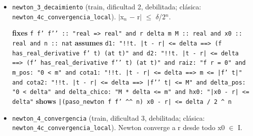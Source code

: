 \documentclass[11pt,a4paper]{article}
\begin{document}
\begin{itemize}
  \item \texttt{newton\_\allowbreak{}3\_\allowbreak{}decaimiento} (train, dificultad 2, debilitada; clásica: \texttt{newton\_\allowbreak{}4c\_\allowbreak{}convergencia\_\allowbreak{}local}). $|$x$_{n}$ $-$ r$|$ $\le $ $\delta $/2$^{n}$.\\
  {\footnotesize \textbf{fixes} \texttt{f f' f'{}' :\allowbreak{}:\allowbreak{} "real =\allowbreak{}> real" and r delta m M :\allowbreak{}:\allowbreak{} real and x0 :\allowbreak{}:\allowbreak{} real and n :\allowbreak{}:\allowbreak{} nat} \textbf{assumes} \texttt{d1:\allowbreak{} "!{}!t. |\allowbreak{}t -\allowbreak{} r|\allowbreak{} <=\allowbreak{} delta =\allowbreak{}=\allowbreak{}> (\allowbreak{}f has\_\allowbreak{}real\_\allowbreak{}derivative f' t) (\allowbreak{}at t)" and d2:\allowbreak{} "!{}!t. |\allowbreak{}t -\allowbreak{} r|\allowbreak{} <=\allowbreak{} delta =\allowbreak{}=\allowbreak{}> (\allowbreak{}f' has\_\allowbreak{}real\_\allowbreak{}derivative f'{}' t) (\allowbreak{}at t)" and raiz:\allowbreak{} "f r =\allowbreak{} 0" and m\_\allowbreak{}pos:\allowbreak{} "0 < m" and cota1:\allowbreak{} "!{}!t. |\allowbreak{}t -\allowbreak{} r|\allowbreak{} <=\allowbreak{} delta =\allowbreak{}=\allowbreak{}> m <=\allowbreak{} |\allowbreak{}f' t|\allowbreak{}" and cota2:\allowbreak{} "!{}!t. |\allowbreak{}t -\allowbreak{} r|\allowbreak{} <=\allowbreak{} delta =\allowbreak{}=\allowbreak{}> |\allowbreak{}f'{}' t|\allowbreak{} <=\allowbreak{} M" and delta\_\allowbreak{}pos:\allowbreak{} "0 < delta" and delta\_\allowbreak{}chico:\allowbreak{} "M *\allowbreak{} delta <=\allowbreak{} m" and hx0:\allowbreak{} "|\allowbreak{}x0 -\allowbreak{} r|\allowbreak{} <=\allowbreak{} delta"} \textbf{shows} \texttt{|\allowbreak{}(\allowbreak{}paso\_\allowbreak{}newton f f' \textasciicircum{}\textasciicircum{} n) x0 -\allowbreak{} r|\allowbreak{} <=\allowbreak{} delta /\allowbreak{} 2 \textasciicircum{} n}\par}
  \item \texttt{newton\_\allowbreak{}4\_\allowbreak{}convergencia} (train, dificultad 3, debilitada; clásica: \texttt{newton\_\allowbreak{}4c\_\allowbreak{}convergencia\_\allowbreak{}local}). Newton converge a r desde todo x0 $\in $ I.\\

\end{itemize}
\end{document}

